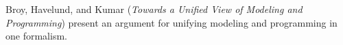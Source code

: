 

Broy, Havelund, and Kumar
\cite{isola-2016-broy}
({\em Towards a Unified View of Modeling and Programming})
present an argument for unifying modeling and programming in one formalism.
